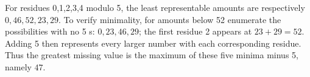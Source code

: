 For residues 0,1,2,3,4 modulo 5, the least representable amounts are respectively $0,46,52,23,29$. To verify minimality, for amounts below 52 enumerate the possibilities with no 5 s: $0,23,46,29$; the first residue 2 appears at $23+29=52$. Adding 5 then represents every larger number with each corresponding residue. Thus the greatest missing value is the maximum of these five minima minus 5, namely $\boxed{47}$.

